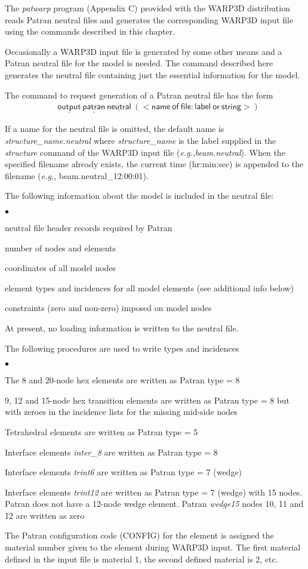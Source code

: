 \documentclass[11pt]{report}
\numberwithin{equation}{section}
\newcommand{\nin} {\noindent}
\newcommand{\ul} {\underline}
\newcommand{\hv} {\mathsf}   %
\newcommand{\eg}{\emph{e.g.},\xspace}
\newcommand{\ti}{\emph}
\newcommand{\squishlist}{
 \begin{list}{$\bullet$}
  { \setlength{\itemsep}{0pt}
     \setlength{\parsep}{3pt}
     \setlength{\topsep}{3pt}
     \setlength{\partopsep}{0pt}
     \setlength{\leftmargin}{1.5em}
     \setlength{\labelwidth}{1em}
     \setlength{\labelsep}{0.5em} } }
\newcommand{\squishend}{
  \end{list}  }
\begin{document}
The \ti{patwarp} program (Appendix C) provided with the WARP3D distribution
reads Patran neutral files and generates the corresponding
WARP3D input file using the commands described in this chapter.

Occasionally a WARP3D input file is generated by some other means and a
Patran neutral file for the model is needed. The command described here 
generates the neutral file containing just the essential information for the
model.

The command to request generation of a Patran neutral file has the form
\begin{align*}
& \hv{\ul{output}\ \ul{patran} \ \ul{neutral}\ (<name\ of\ file:label\ or\ string>)  }
\end{align*}

\nin If a name for the neutral file is omitted, the default name is \ti{structure\_name.neutral}
where \ti{structure\_name} is the label supplied in the \ti{structure} command of the
WARP3D input file (\eg \ti{beam.neutral}). When the specified filename already exists, the
current time (hr:min:sec) is appended to the filename (\eg beam.neutral\_12:00:01).

The following information about the model is included in the neutral file:
\small
\squishlist
\item neutral file header records required by Patran
\item number of nodes and elements
\item coordinates of all model nodes
\item element types and incidences for all model elements (see additional info below)
\item constraints (zero and non-zero) imposed on model nodes
\squishend 
\normalsize

\noindent At present, no loading information is written to the neutral file.

\noindent The following procedures are used to write types and incidences
\small
\squishlist
\item The 8 and 20-node hex elements are
written as Patran type = 8
\item  9, 12 and 15-node hex transition elements are written as Patran type = 8 
but with zeroes in the incidence lists for the missing mid-side nodes
\item Tetrahedral elements are written as Patran type = 5
\item Interface elements \ti{inter\_8} are written as Patran type = 8
\item Interface elements \ti{trint6}  are written as Patran type = 7 (wedge)
\item Interface elements \ti{trint12}   are written as Patran type = 7 (wedge) with
15 nodes. Patran does not have a 12-node wedge element. Patran \ti{wedge15} nodes 10, 11 and 12
are written as zero
\item The Patran configuration code (CONFIG) for the
element is assigned the material number given to the element during WARP3D input. The first material 
defined in the input file is material 1, the second defined material is 2, etc.
\squishend 
\normalsize
\end{document}
